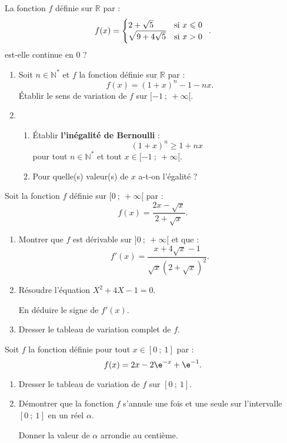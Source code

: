 \begin{question}[topic=fonction]
  La fonction $f$ définie sur $\mathbb{R}$ par :
  \[f(x)=\left\{\begin{array}{@{}ll}
        2+\sqrt{5} & \text{si~} x\leqslant0 \\
        \sqrt{9+4\sqrt{5}} & \text{si~} x>0 \\
  \end{array}\right..\]
  est-elle continue en 0 ?
\end{question}

\begin{question}[topic=fonction]
  \begin{enumerate}
    \item Soit $n\in\mathbb{N}^*$  et $f$ la fonction définie sur
      $\mathbb{R}$ par : \[f(x)=(1+x)^n-1-nx.\]
      Établir le sens de variation  de $f$ sur $[-1~;~+\infty[$.
    \item
      \begin{enumerate}
        \item Établir \textbf{l'inégalité de Bernoulli} :
          \[(1+x)^n\geqslant 1+nx\]
          pour tout $n\in\mathbb{N}^*$ et tout $x\in[-1~;~+\infty[$.
        \item Pour quelle(s) valeur(s) de $x$ a-t-on l'égalité ?
      \end{enumerate}
  \end{enumerate}
\end{question}

\begin{question}[topic=fonction]
  Soit la fonction $f$ définie sur $[0~;~+\infty[$ par :
  \[f(x)=\dfrac{2x-\sqrt{x}}{2+\sqrt{x}}.\]
  \begin{enumerate}
    \item Montrer que $f$ est dérivable sur $]0~;~+\infty[$ et que :
      \[f'(x)=\dfrac{x+4\sqrt{x}-1}{\sqrt{x}\left(2+\sqrt{x}\right)^2}.\]
    \item Résoudre l'équation $X^2+4X-1=0$.\par
      En déduire le signe de $f'(x)$.
    \item Dresser le tableau de variation complet de $f$.
  \end{enumerate}
\end{question}

\begin{question}[topic=exponetielle]
  Soit $f$ la fonction définie pour tout $x\in\left[0~;~1\right]$ par :
  \[f(x)=2x-2\e^{-x}+\e^{-1}.\]
  \begin{enumerate}
    \item Dresser le tableau de variation de $f$ sur $\left[0~;~1\right]$.
    \item Démontrer que la fonction $f$ s'annule une fois et une seule sur
      l'intervalle $\left[0~;~1\right]$ en un réel $\alpha$.\par
      Donner la valeur de $\alpha$ arrondie au centième.
  \end{enumerate}
\end{question}

